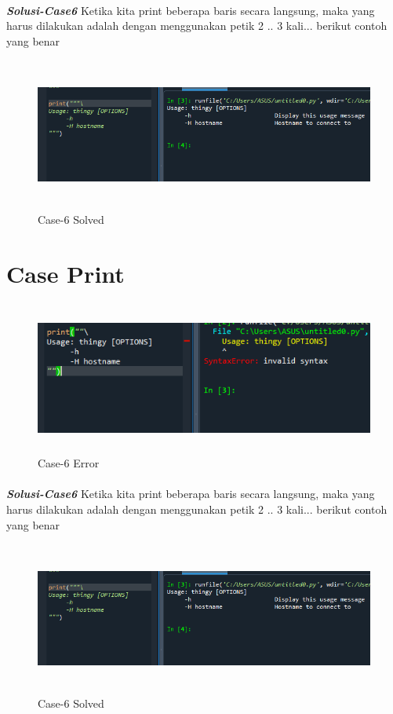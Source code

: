 \documentclass[12pt,a4paper]{article}
\begin{document}
\paragraph{}\textbf{\textit{Solusi-Case6}} {Ketika kita print beberapa baris secara langsung, maka yang harus dilakukan adalah dengan menggunakan petik 2 .. 3 kali... berikut contoh yang benar}
\begin{figure}[ht]
    \centerline{\includegraphics[width=15cm,height=5cm]{image/case6-solved.png}}
    \renewcommand{\figurename}{Gambar}
    \caption{Case-6 Solved}
\end{figure}

\newpage
\section{Case Print}
\begin{figure}[ht]
    \centerline{\includegraphics[width=15cm,height=5cm]{image/case6.png}}
    \renewcommand{\figurename}{Gambar}
    \caption{Case-6 Error}
\end{figure}
\paragraph{}\textbf{\textit{Solusi-Case6}} {Ketika kita print beberapa baris secara langsung, maka yang harus dilakukan adalah dengan menggunakan petik 2 .. 3 kali... berikut contoh yang benar}
\begin{figure}[ht]
    \centerline{\includegraphics[width=15cm,height=5cm]{image/case6-solved.png}}
    \renewcommand{\figurename}{Gambar}
    \caption{Case-6 Solved}
\end{figure}
\end{document}
